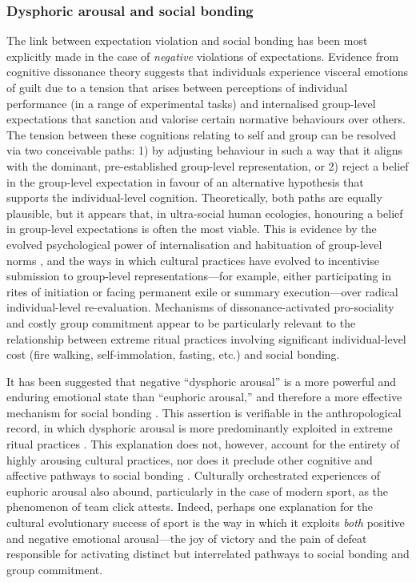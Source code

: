 \begin{mccorrection}
\subsubsection{Dysphoric arousal and social bonding}
The link between expectation violation and social bonding has been most explicitly made in the case of \textit{negative} violations of expectations.  Evidence from cognitive dissonance theory \citep{Festinger1957} suggests that individuals experience visceral emotions of guilt due to a tension that arises between perceptions of individual performance (in a range of experimental tasks) and internalised group-level expectations that sanction and valorise certain normative behaviours over others\citep{Kenworthy2011,Stone2001}.  The tension between these cognitions relating to self and group can be resolved via two conceivable paths: 1) by adjusting behaviour in such a way that it aligns with the dominant, pre-established group-level representation, or 2) reject a belief in the group-level expectation in favour of an alternative hypothesis that supports the individual-level cognition.
Theoretically, both paths are  equally plausible, but it appears that, in ultra-social human ecologies, honouring a belief in group-level expectations is often the most viable.  This is evidence by the evolved psychological power of internalisation and habituation of group-level norms \citep{Chudek2011}, and the ways in which cultural practices have evolved to incentivise submission to group-level representations---for example, either participating in rites of initiation or facing permanent exile or summary execution\citep[cf.][18]{Whitehouse2014}---over radical individual-level re-evaluation\citep{Sosis2003}.
Mechanisms of dissonance-activated pro-sociality and costly group commitment appear to be particularly relevant to the relationship between extreme ritual practices involving significant individual-level cost (fire walking, self-immolation, fasting, etc.) and social bonding\citep{Sosis2003,Xygalatas2013,Bastian2014,Fischer2014,Whitehouse2014}.

It has been suggested that negative ``dysphoric arousal'' is a more powerful and enduring emotional state than ``euphoric arousal,'' and therefore a more effective mechanism for social bonding \citep{Whitehouse1996,Whitehouse2004}.  This assertion is verifiable in the anthropological record, in which dysphoric arousal is more predominantly exploited in extreme ritual practices \citep{Atkinson2011,Whitehouse2014}. This explanation does not, however, account for the entirety of highly arousing cultural practices, nor does it preclude other cognitive and affective pathways to social bonding \citep{Downey2014,Xygalatas2014,Fischer2014,Fischer2014a}.  Culturally orchestrated experiences of euphoric arousal also abound, particularly in the case of modern sport, as the phenomenon of team click attests. Indeed, perhaps one explanation for the cultural evolutionary success of sport is the way in which it exploits \textit{both} positive and negative emotional arousal---the joy of victory and the pain of defeat responsible for activating distinct but interrelated pathways to social bonding and group commitment.
\end{mccorrection}


